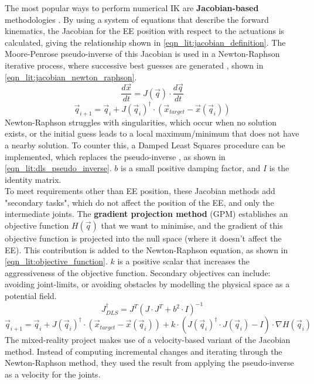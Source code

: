 
\newpage
The most popular ways to perform numerical IK are \textbf{Jacobian-based} methodologies \cite{bib:ik_motion_planning}\cite{bib:ik_potential_fields}. By using a system of equations that describe the forward kinematics, the Jacobian for the EE position with respect to the actuations is calculated, giving the relationship shown in \autoref{eqn_lit:jacobian_definition}. The Moore-Penrose pseudo-inverse of this Jacobian is used in a Newton-Raphson iterative process, where successive best guesses are generated \cite{bib:ik_motion_planning}, shown in \autoref{eqn_lit:jacobian_newton_raphson}.
\begin{equation}
    \frac{d\vec{x}}{dt}=J(\vec{q})\cdot\frac{d\vec{q}}{dt}
    \label{eqn_lit:jacobian_definition}
\end{equation}
\begin{equation}
    \vec{q}_{i+1}=\vec{q}_i+J(\vec{q}_{i})^{\dagger}\cdot(\vec{x}_{target}-\vec{x}(\vec{q}_i))
    \label{eqn_lit:jacobian_newton_raphson}
\end{equation}
Newton-Raphson struggles with singularities, which occur when no solution exists, or the initial guess leads to a local maximum/minimum that does not have a nearby solution. To counter this, a Damped Least Squares procedure can be implemented, which replaces the pseudo-inverse \cite{bib:ik_motion_planning}, as shown in \autoref{eqn_lit:dls_pseudo_inverse}. $b$ is a small positive damping factor, and $I$ is the identity matrix.\\
To meet requirements other than EE position, these Jacobian methods add "secondary tasks", which do not affect the position of the EE, and only the intermediate joints. The \textbf{gradient projection method} (GPM) \cite{bib:ik_joint_limits} establishes an objective function $H(\vec{q})$ that we want to minimise, and the gradient of this objective function is projected into the null space (where it doesn't affect the EE). This contribution is added to the Newton-Raphson equation, as shown in \autoref{eqn_lit:objective_function}. $k$ is a positive scalar that increases the aggressiveness of the objective function. Secondary objectives can include: avoiding joint-limits, or avoiding obstacles by modelling the physical space as a potential field.
\begin{equation}
    J^{\dagger}_{DLS}=J^T(J\cdot J^T+b^2\cdot I)^{-1}
    \label{eqn_lit:dls_pseudo_inverse}
\end{equation}
\begin{equation}
    \vec{q}_{i+1}=\vec{q}_i+J(\vec{q}_{i})^{\dagger}\cdot(\vec{x}_{target}-\vec{x}(\vec{q}_i))+k\cdot(J(\vec{q}_i)^{\dagger}\cdot J(\vec{q}_i)-I)\cdot\nabla H(\vec{q}_i)
    \label{eqn_lit:objective_function}
\end{equation}
The mixed-reality project \cite{bib:teleoperation_mixed_reality} makes use of a velocity-based variant of the Jacobian method. Instead of computing incremental changes and iterating through the Newton-Raphson method, they used the result from applying the pseudo-inverse as a velocity for the joints.

